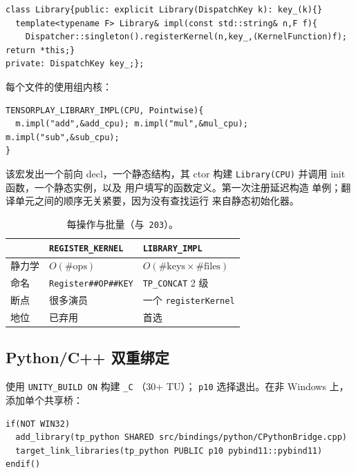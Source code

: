 \begin{lstlisting}[caption={chaining helper.}, label=lst:libraryclass]
class Library{public: explicit Library(DispatchKey k): key_(k){}
  template<typename F> Library& impl(const std::string& n,F f){
    Dispatcher::singleton().registerKernel(n,key_,(KernelFunction)f); return *this;}
private: DispatchKey key_;};
\end{lstlisting}

每个文件的使用组内核：

\begin{lstlisting}[caption={Backend grouping.}, label=lst:backenduse]
TENSORPLAY_LIBRARY_IMPL(CPU, Pointwise){
  m.impl("add",&add_cpu); m.impl("mul",&mul_cpu); m.impl("sub",&sub_cpu);
}
\end{lstlisting}

该宏发出一个前向 decl，一个静态结构，其 ctor 构建
\texttt{Library(CPU)} 并调用 init 函数，一个静态实例，以及
用户填写的函数定义。第一次注册延迟构造
单例；翻译单元之间的顺序无关紧要，因为没有查找运行
来自静态初始化器。

\begin{table}[H]
\centering
\caption{每操作与批量（与\ \texttt{203}）。}
\label{tab:macros}
\small
\begin{tabular}{lll}
\toprule
  & \texttt{REGISTER\_KERNEL} & \texttt{LIBRARY\_IMPL} \\
\midrule
静力学 & $O(\#\text{ops})$ & $O(\#\text{keys}\times\#\text{files})$ \\
命名 & \texttt{Register\#\#OP\#\#KEY} & \texttt{TP\_CONCAT} 2 级 \\
断点 & 很多演员 & 一个 \texttt{registerKernel} \\
地位 & 已弃用 & 首选 \\
\bottomrule
\end{tabular}
\end{table}

\subsection{Python/C++ 双重绑定}
\label{sec:dualbinding}

使用 \texttt{UNITY\_BUILD ON} 构建 \texttt{\_C}
（30+ TU）； \texttt{p10} 选择退出。在非 Windows 上，
添加单个共享桥：

\begin{lstlisting}[caption={one shared copy.}, label=lst:tppythontarget]
if(NOT WIN32)
  add_library(tp_python SHARED src/bindings/python/CPythonBridge.cpp)
  target_link_libraries(tp_python PUBLIC p10 pybind11::pybind11)
endif()
\end{lstlisting}

